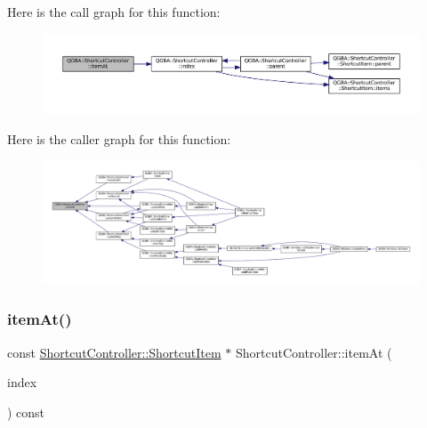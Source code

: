 Here is the call graph for this function\+:
\nopagebreak
\begin{figure}[H]
\begin{center}
\leavevmode
\includegraphics[width=350pt]{class_q_g_b_a_1_1_shortcut_controller_a1920d0e239df0d95d87b95b2d286404c_cgraph}
\end{center}
\end{figure}
Here is the caller graph for this function\+:
\nopagebreak
\begin{figure}[H]
\begin{center}
\leavevmode
\includegraphics[width=350pt]{class_q_g_b_a_1_1_shortcut_controller_a1920d0e239df0d95d87b95b2d286404c_icgraph}
\end{center}
\end{figure}
\mbox{\label{class_q_g_b_a_1_1_shortcut_controller_aaa91a06146dda9ceb44d744901ba7b92}} 
\subsubsection{\texorpdfstring{item\+At()}{itemAt()}\hspace{0.1cm}{\footnotesize\ttfamily [2/2]}}
{\footnotesize\ttfamily const \mbox{\hyperlink{class_q_g_b_a_1_1_shortcut_controller_1_1_shortcut_item}{Shortcut\+Controller\+::\+Shortcut\+Item}} $\ast$ Shortcut\+Controller\+::item\+At (\begin{DoxyParamCaption}\item[{const Q\+Model\+Index \&}]{index }\end{DoxyParamCaption}) const\hspace{0.3cm}{\ttfamily [private]}}

